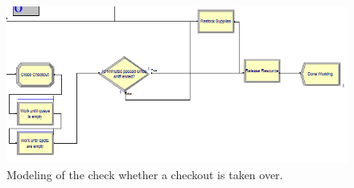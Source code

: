 \begin{figure}[]
	\includegraphics[scale=1]{images/model-description/close-restock-release.PNG}
	\caption{Modeling of the check whether a checkout is taken over.}
	\label{fig:closerestockandrelease}
\end{figure}

